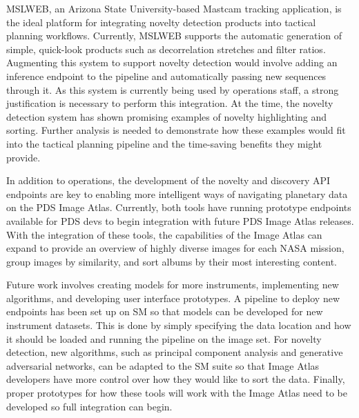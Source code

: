 MSLWEB, an Arizona State University-based Mastcam tracking application, is the ideal platform for integrating novelty detection products into tactical planning workflows. 
Currently, MSLWEB supports the automatic generation of simple, quick-look products such as decorrelation stretches and filter ratios. 
Augmenting this system to support novelty detection would involve adding an inference endpoint to the pipeline and automatically passing new sequences through it. 
As this system is currently being used by operations staff, a strong justification is necessary to perform this integration. 
At the time, the novelty detection system has shown promising examples of novelty highlighting and sorting. 
Further analysis is needed to demonstrate how these examples would fit into the tactical planning pipeline and the time-saving benefits they might provide.

In addition to operations, the development of the novelty and discovery API endpoints are key to enabling more intelligent ways of navigating planetary data on the PDS Image Atlas. 
Currently, both tools have running prototype endpoints available for PDS devs to begin integration with future PDS Image Atlas releases.
With the integration of these tools, the capabilities of the Image Atlas can expand to provide an overview of highly diverse images for each NASA mission, group images by similarity, and sort albums by their most interesting content.

Future work involves creating models for more instruments, implementing new algorithms, and developing user interface prototypes. 
A pipeline to deploy new endpoints has been set up on SM so that models can be developed for new instrument datasets. 
This is done by simply specifying the data location and how it should be loaded and running the pipeline on the image set. 
For novelty detection, new algorithms, such as principal component analysis and generative adversarial networks, can be adapted to the SM suite so that Image Atlas developers have more control over how they would like to sort the data. 
Finally, proper prototypes for how these tools will work with the Image Atlas need to be developed so full integration can begin.
